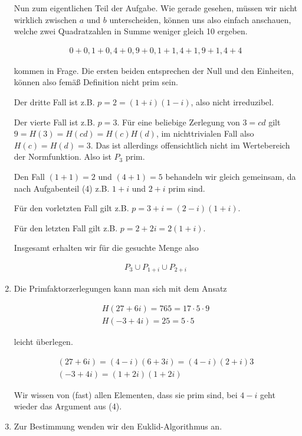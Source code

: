 \begin{solution}
\begin{enumerate}
  Nun zum eigentlichen Teil der Aufgabe. Wie gerade gesehen, müssen wir nicht wirklich zwischen $a$ und $b$ unterscheiden, können uns also einfach anschauen, welche zwei Quadratzahlen in Summe weniger gleich 10 ergeben.

  \begin{align*}
    0+0, 1+0, 4+0, 9+0, 1+1, 4+1, 9+1, 4+4
  \end{align*}

  kommen in Frage. Die ersten beiden entsprechen der Null und den Einheiten, können also femäß Definition nicht prim sein.

  Der dritte Fall ist z.B. $p = 2 = (1+i)(1-i)$, also nicht irreduzibel.

  Der vierte Fall ist z.B. $p = 3$. Für eine beliebige Zerlegung von $3 = cd$ gilt $9 = H(3) = H(cd) = H(c)H(d)$, im nichttrivialen Fall also $H(c)=H(d) = 3$. Das ist allerdings offensichtlich nicht im Wertebereich der Normfunktion. Also ist $P_3 $ prim.

  Den Fall $(1+1) = 2$ und $(4+1) = 5$ behandeln wir gleich gemeinsam, da nach Aufgabenteil (4) z.B. $1+i$ und $2+i$ prim sind.

  Für den vorletzten Fall gilt z.B. $p = 3+i = (2-i)(1+i)$.

  Für den letzten Fall gilt z.B. $p = 2+2i = 2(1+i)$.

  Insgesamt erhalten wir für die gesuchte Menge also

  \begin{align*}
    P_3 \cup P_{1+i} \cup P_{2+i}
  \end{align*}

  \item Die Primfaktorzerlegungen kann man sich mit dem Ansatz

  \begin{align*}
    H(27+6i) = 765 = 17 \cdot 5 \cdot 9 \\
    H(-3+4i) = 25 = 5 \cdot 5
  \end{align*}

  leicht überlegen.

  \begin{align*}
    (27+6i) = (4-i)(6+3i) = (4-i)(2+i)3 \\
    (-3+4i) = (1+2i)(1+2i)
  \end{align*}

  Wir wissen von (fast) allen Elementen, dass sie prim sind, bei $4-i$ geht wieder das Argument aus (4).

  \item Zur Bestimmung wenden wir den Euklid-Algorithmus an.


\end{enumerate}
\end{solution}
